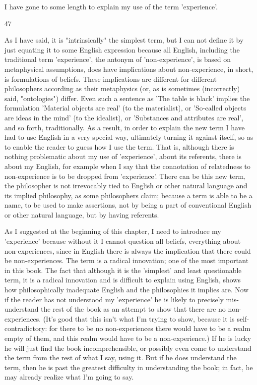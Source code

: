 \documentclass[10pt,twoside]{memoir}
\begin{document}
\begin{enumerate}
{{{{{{{{{{{{I have gone to some length to explain my use of the term 'experience'. 


47 


As I have said, it is "intrinsically" the simplest term, but I can not define it 
by just equating it to some English expression because all English, including 
the traditional term 'experience', the antonym of 'non-experience', is based 
on metaphysical assumptions, does have implications about non-experience, 
in short, is formulations of beliefs. These implications are different for 
different philosophers according as their metaphysics (or, as is sometimes 
(incorrectly) said, "ontologies") differ. Even such a sentence as 'The table is 
black' implies the formulation 'Material objects are real' (to the materialist), 
or 'So-called objects are ideas in the mind' (to the idealist), or 'Substances 
and attributes are real', and so forth, traditionally. As a result, in order to 
explain the new term I have had to use English in a very special way, 
ultimately turning it against itself, so as to enable the reader to guess how I 
use the term. That is, although there is nothing problematic about my use of 
'experience', about its referents, there is about my English, for example 
when I say that the connotation of relatedness to non-experience is to be 
dropped from 'experience'. There can be this new term, the philosopher is 
not irrevocably tied to English or other natural language and its implied 
philosophy, as some philosophers claim; because a term is able to be a name, 
to be used to make assertions, not by being a part of conventional English or 
other natural language, but by having referents. 

As I suggested at the beginning of this chapter, I need to introduce my 
'experience' because without it I cannot question all beliefs, everything 
about non-experiences, since in English there is always the implication that 
there could be non-experiences. The term is a radical innovation; one of the 
most important in this book. The fact that although it is the 'simplest' and 
least questionable term, it is a radical innovation and is difficult to explain 
using English, shows how philosophically inadequate English and the 
philosophies it implies are. Now if the reader has not understood my 
'experience' he is likely to precisely mis-understand the rest of the book as 
an attempt to show that there are no non-experiences. (It's good that this 
isn't what I'm trying to show, because it is self-contradictory: for there to be 
no non-experiences there would have to be a realm empty of them, and this 
realm would have to be a non-experience.) If he is lucky he will just find the 
book incomprehensible, or possibly even come to understand the term from 
the rest of what I say, using it. But if he does understand the term, then he is 
past the greatest difficulty in understanding the book; in fact, he may 
already realize what I'm going to say. 


}}}}}}}}}}}}
\end{enumerate}
\end{document}
